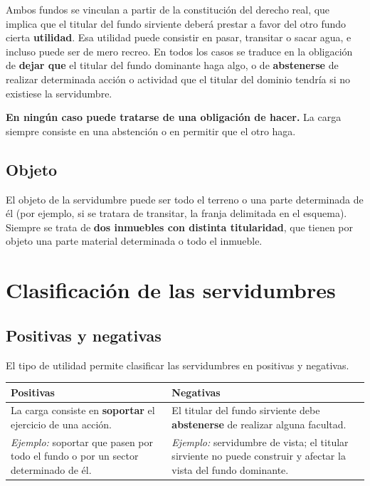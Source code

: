 \documentclass[12pt,oneside]{book}
\begin{document}
Ambos fundos se vinculan a partir de la constitución del derecho real, que implica que el titular del fundo sirviente deberá prestar a favor del otro fundo cierta \textbf{utilidad}. Esa utilidad puede consistir en pasar, transitar o sacar agua, e incluso puede ser de mero recreo. En todos los casos se traduce en la obligación de \textbf{dejar que} el titular del fundo dominante haga algo, o de \textbf{abstenerse} de realizar determinada acción o actividad que el titular del dominio tendría si no existiese la servidumbre.

\begin{importante}
\textbf{En ningún caso puede tratarse de una obligación de hacer.} La carga siempre consiste en una abstención o en permitir que el otro haga.
\end{importante}

\subsection{Objeto}

El objeto de la servidumbre puede ser todo el terreno o una parte determinada de él (por ejemplo, si se tratara de transitar, la franja delimitada en el esquema). Siempre se trata de \textbf{dos inmuebles con distinta titularidad}, que tienen por objeto una parte material determinada o todo el inmueble.

\section{Clasificación de las servidumbres}

\subsection{Positivas y negativas}

El tipo de utilidad permite clasificar las servidumbres en positivas y negativas.

\begin{table}[H]
\centering
\begin{tabularx}{\textwidth}{@{}>{\raggedright\arraybackslash}X>{\raggedright\arraybackslash}X@{}}
\toprule
\textbf{Positivas} & \textbf{Negativas} \\
\midrule
La carga consiste en \textbf{soportar} el ejercicio de una acción. & El titular del fundo sirviente debe \textbf{abstenerse} de realizar alguna facultad. \\
\textit{Ejemplo:} soportar que pasen por todo el fundo o por un sector determinado de él. & \textit{Ejemplo:} servidumbre de vista; el titular sirviente no puede construir y afectar la vista del fundo dominante. \\
\bottomrule
\end{tabularx}
\end{table}
\end{document}

